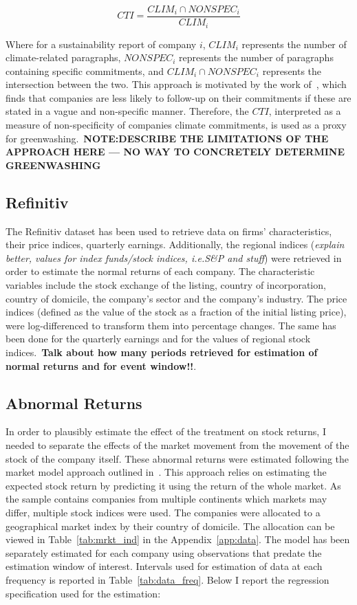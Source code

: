 \documentclass[12pt]{article}
\begin{document}
\begin{equation}
    CTI = \frac{CLIM_i \cap NONSPEC_i}{CLIM_{i}}
\end{equation}

Where for a sustainability report of company $i$, $CLIM_i$ represents the number of climate-related paragraphs, $NONSPEC_i$ represents the number of paragraphs containing specific commitments, and $CLIM_i \cap NONSPEC_i$ represents the intersection between the two. 
This approach is motivated by the work of\ \cite{coen_are_2022}, which finds that companies are less likely to follow-up on their commitments if these are stated in a vague and non-specific manner. Therefore, the $CTI$, interpreted as a measure of non-specificity of companies climate commitments, is used as a proxy for greenwashing.\ \textbf{NOTE:\@ DESCRIBE THE LIMITATIONS OF THE APPROACH HERE --- NO WAY TO CONCRETELY DETERMINE GREENWASHING}


\subsection{Refinitiv}

The Refinitiv dataset has been used to retrieve data on firms' characteristics, their price indices, quarterly earnings. Additionally, the regional indices (\textit{explain better, values for index funds/stock indices, i.e.\@ S\&P and stuff}) were retrieved in order to estimate the normal returns of each company. The characteristic variables include the stock exchange of the listing, country of incorporation, country of domicile, the company's sector and the company's industry. The price indices (defined as the value of the stock as a fraction of the initial listing price), were log-differenced to transform them into percentage changes. The same has been done for the quarterly earnings and for the values of regional stock indices.\ \textbf{Talk about how many periods retrieved for estimation of normal returns and for event window!!}.

\subsection{Abnormal Returns}

In order to plausibly estimate the effect of the treatment on stock returns, I needed to separate the effects of the market movement from the movement of the stock of the company itself. These abnormal returns were estimated following the market model approach outlined in\ \cite{mackinlayEventStudiesEconomics1997}. This approach relies on estimating the expected stock return by predicting it using the return of the whole market. As the sample contains companies from multiple continents which markets may differ, multiple stock indices were used. The companies were allocated to a geographical market index by their country of domicile. The allocation can be viewed in Table~\ref{tab:mrkt_ind} in the Appendix~\ref{app:data}. The model has been separately estimated for each company using observations that predate the estimation window of interest. Intervals used for estimation of data at each frequency is reported in Table~\ref{tab:data_freq}. Below I report the regression specification used for the estimation:
\end{document}
